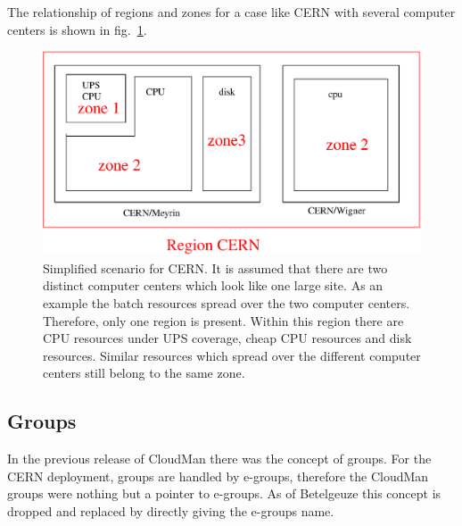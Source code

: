 The relationship of regions and zones for a case like  CERN with several computer centers is shown in fig.~\ref{cerncase}.
\begin{figure}
\begin{center}
\includegraphics[width=\textwidth]{cerncase.eps}
\caption{\label{cerncase}Simplified scenario for CERN. It is assumed that there are two distinct computer centers which look like one large site. As an example the batch resources spread over the two computer centers. Therefore, only one region is present. Within this region there are CPU resources under UPS coverage, cheap CPU resources and disk resources. Similar resources which spread over the different computer centers still belong to the same zone.}
\end{center}
\end{figure}

\subsection{Groups}
In the previous release of CloudMan there was the concept of groups. For the CERN deployment, groups are handled by e-groups, therefore the CloudMan groups were nothing but a pointer to e-groups. As of Betelgeuze this concept is dropped and replaced by directly giving the e-groups name.

